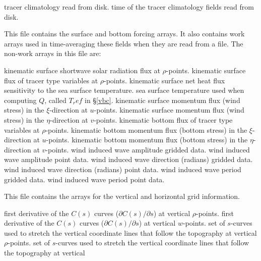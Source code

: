 \begin{klist}
\begin{klist}
    tracer climatology read from disk.
            time of the tracer climatology fields read from
    disk.
    \end{klist}
    This file contains the surface and bottom forcing
  arrays.  It also contains work arrays used in time-averaging these
  fields when they are read from a file.  The non-work arrays in this
  file are:
    \begin{klist}
              kinematic surface shortwave solar radiation
   flux at $\rho$-points.
              kinematic surface flux of tracer type
   variables at $\rho$-points.
               kinematic surface net heat flux sensitivity
   to the sea surface temperature.
                sea surface temperature used when computing
   $Q$, called $T_ref$ in \S\ref{vbc}.
              kinematic surface momentum flux (wind
   stress) in the $\xi$-direction at $u$-points.
              kinematic surface momentum flux (wind
   stress) in the $\eta$-direction at $v$-points.
              kinematic bottom flux of tracer type
   variables at $\rho$-points.
              kinematic bottom momentum flux (bottom
   stress) in the $\xi$-direction at $u$-points.
              kinematic bottom momentum flux (bottom
   stress) in the $\eta$-direction at $v$-points.
               wind induced wave amplitude gridded data.
               wind induced wave amplitude point data.
               wind induced wave direction (radians)
   gridded data.
               wind induced wave direction (radians)
   point data.
               wind induced wave period gridded data.
               wind induced wave period point data.
    \end{klist}
    This file contains the arrays for the vertical and
  horizontal grid information.
    \begin{klist}
          first derivative of the $C(s)$ curves
    ($\partial C(s)/\partial s$) at vertical $\rho$-points.
          first derivative of the $C(s)$ curves
    ($\partial C(s)/\partial s$) at vertical $w$-points.
          set of $s$-curves used to stretch the vertical
    coordinate lines that follow the topography at vertical
    $\rho$-points.
          set of $s$-curves used to stretch the vertical
    coordinate lines that follow the topography at vertical

\end{klist}
\end{klist}
